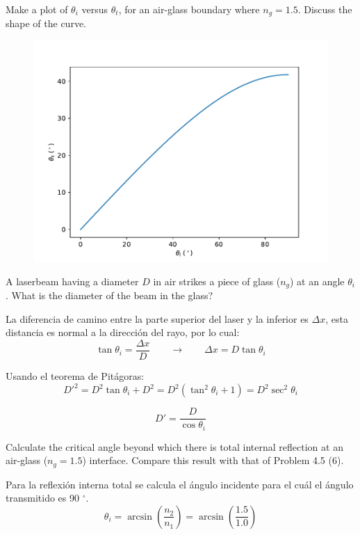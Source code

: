 \documentclass[addpoints,10pt]{exam}
\begin{document}
\begin{questions}
		{
			\question
			Make a plot of $\theta_i$ versus $\theta_t$, for an air-glass boundary where
			$n_{g} = 1.5$. Discuss the shape of the curve.
		}
		
		\begin{figure}[h]
			\centering
			\includegraphics[width = 0.6\linewidth]{418.pdf}
		\end{figure}
		
		{	\question
			A laserbeam having a diameter $D$ in air strikes a piece of glass ($n_{g}$) at an angle $\theta_i$. What is the diameter of the beam in the glass?
		}
		
		La diferencia de camino entre la parte superior del laser y la inferior es $\Delta x$, esta distancia es normal a la direcci\'on del rayo, por lo cual:
		\begin{equation}
			\tan\theta_i = \dfrac{\Delta x}{D} \qquad \longrightarrow \qquad \Delta x = D\tan\theta_i
		\end{equation}
		
		Usando el teorema de Pit\'agoras:
		\begin{equation}
			D'^2 = D^2\tan\theta_i + D^2 = D^2\left(\tan^2\theta_i + 1\right) = D^2\sec^2\theta_i
		\end{equation}
		
		\begin{equation}
			D' = \dfrac{D}{\cos\theta_i}
		\end{equation}
		
		{
			\question
			Calculate the critical angle beyond which there is total internal reflection at an air-glass ($n_g = 1.5$) interface. Compare this result with that of Problem 4.5 (6).
		}
		
		Para la reflexi\'on interna total se calcula el \'angulo incidente para el cu\'al el \'angulo transmitido es 90 $^\circ$.
		\begin{equation}
			\theta_i =  \arcsin\left(\dfrac{n_2}{n_1}\right) = \arcsin\left(\dfrac{1.5}{1.0}\right)
		\end{equation}
		

\end{questions}
\end{document}
